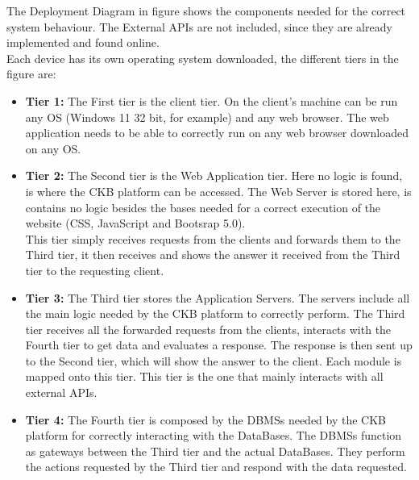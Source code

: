 \documentclass{article}
\begin{document}
{The Deployment Diagram in figure shows the components needed for the correct system behaviour. The External APIs are not included, since they 
are already implemented and found online.\\
Each device has its own operating system downloaded, the different tiers in the figure are:
\begin{itemize}
\item \textbf{Tier 1:} The First tier is the client tier. On the client's machine can be run any OS (Windows 11 32 bit, for example) and any web browser. The web application
needs to be able to correctly run on any web browser downloaded on any OS.\\
\item \textbf{Tier 2:} The Second tier is the Web Application tier. Here no logic is found, is where the CKB platform can be accessed.
The Web Server is stored here, is contains no logic besides the bases needed for a correct execution of the website (CSS, JavaScript and Bootsrap 5.0). \\
This tier simply receives requests from the clients and forwards them to the Third tier, it then receives and shows the answer it received from the Third tier
to the requesting client. \\
\item \textbf{Tier 3:} The Third tier stores the Application Servers. The servers include all the main logic needed by the CKB platform to correctly perform.
The Third tier receives all the forwarded requests from the clients, interacts with the Fourth tier to get data and evaluates a response. The response is 
then sent up to the Second tier, which will show the answer to the client. Each module is mapped onto this tier. This tier is the one that mainly interacts
with all external APIs. \\
\item \textbf{Tier 4:} The Fourth tier is composed by the DBMSs needed by the CKB platform for correctly interacting with the DataBases. The DBMSs function as gateways 
between the Third tier and the actual DataBases. They perform the actions requested by the Third tier and respond with the data requested.\\
\end{itemize}
}
\end{document}
